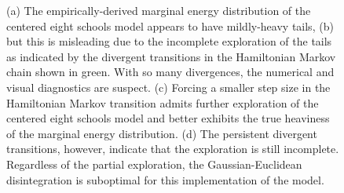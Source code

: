 \documentclass[stslayout]{imsart}
\begin{document}
\begin{figure}
\centering
{}
\caption{(a) The empirically-derived marginal energy distribution of the
centered eight schools model appears to have mildly-heavy tails,
(b) but this is misleading due to the incomplete exploration of the
tails as indicated by the divergent transitions in the Hamiltonian Markov 
chain shown in green.  With so many divergences, the numerical and visual
diagnostics are suspect. (c) Forcing a smaller step size in the Hamiltonian Markov 
transition admits further exploration of the centered eight schools model and better
exhibits the true heaviness of the marginal energy distribution.  (d) The
persistent divergent transitions, however, indicate that the exploration 
is still incomplete.  Regardless of the partial exploration, the 
Gaussian-Euclidean disintegration is suboptimal for this implementation of
the model.}
\label{fig:energy_schools_exp}
\end{figure}
\end{document}
